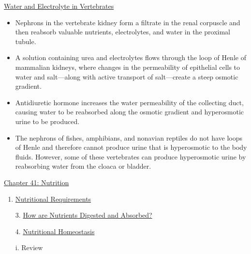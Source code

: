 \documentclass[12pt,letterpaper]{article}
\newcommand{\thetitle}{\hypertarget{home}{Animals and Ecology}}
\begin{document}
        \hyperlink{40.5}{Water and Electrolyte in Vertebrates} 
        \begin{itemize}
            \item Nephrons in the vertebrate kidney form a filtrate in the renal corpuscle and then reabsorb valuable nutrients, electrolytes, and water in the proximal tubule. 
            \item A solution containing urea and electrolytes flows through the loop of Henle of mammalian kidneys, where changes in the permeability of epithelial cells to water and salt—along with active transport of salt—create a steep osmotic gradient. 
            \item Antidiuretic hormone increases the water permeability of the collecting duct, causing water to be reabsorbed along the osmotic gradient and hyperosmotic urine to be produced. 
            \item The nephrons of fishes, amphibians, and non­avian reptiles do not have loops of Henle and therefore cannot produce urine that is hyperosmotic to the body fluids. However, some of these vertebrates can produce hyperosmotic urine by reabsorbing water from the cloaca or bladder.
        \end{itemize}    



\clearpage

\renewcommand{\thetitle}{\hypertarget{41}{Nutrition}}
\hypertarget{41}{}
\setcounter{section}{41}

\begin{chapbox}{\hyperlink{home}{Chapter 41: Nutrition}}
    \begin{enumerate}
        \item \hyperlink{41.1}{Nutritional Requirements}
        \item [3.]\hyperlink{41.3}{How are Nutrients Digested and Absorbed?}
        \item [4.]\hyperlink{41.4}{Nutritional Homeostasis}
        \item [i.]\hypertarget{41.r}{Review}
    \end{enumerate}
\end{chapbox}
\end{document}
